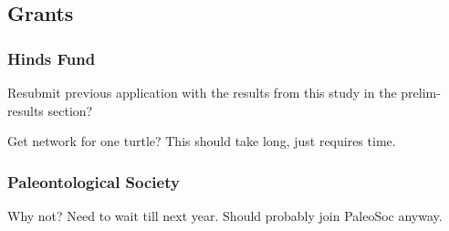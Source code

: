 \documentclass{article}\usepackage{graphicx, color}
\begin{document}
\subsection{Grants}
\subsubsection{Hinds Fund}
Resubmit previous application with the results from this study in the prelim-results section?

Get network for one turtle? This should take long, just requires time.

\subsubsection{Paleontological Society}
Why not? Need to wait till next year. Should probably join PaleoSoc anyway.
\end{document}
